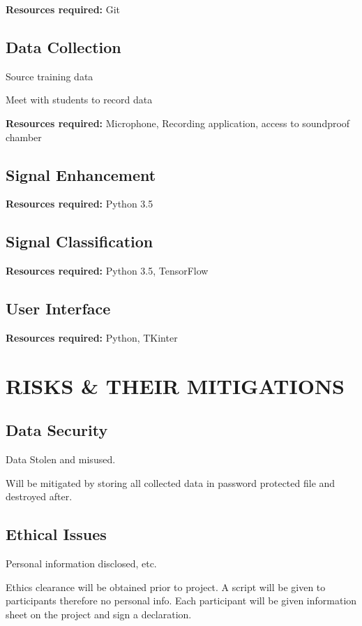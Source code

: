 \documentclass[10pt,twocolumn]{witseiepaper}
\begin{document}
\textbf{Resources required:} Git

\subsection{Data Collection}

Source training data

Meet with students to record data

\textbf{Resources required:} Microphone, Recording application, access to soundproof chamber


\subsection{Signal Enhancement}

\textbf{Resources required:} Python 3.5


\subsection{Signal Classification}

\textbf{Resources required:} Python 3.5, TensorFlow


\subsection{User Interface}

\textbf{Resources required:} Python, TKinter


\section{RISKS \& THEIR MITIGATIONS} %
\subsection{Data Security}
Data Stolen and misused.

Will be mitigated by storing all collected data in password protected file and destroyed after.

\subsection{Ethical Issues}
Personal information disclosed, etc.

Ethics clearance will be obtained prior to project. A script will be given to participants therefore no personal info. Each participant will be given information sheet on the project and sign a declaration.
\end{document}
